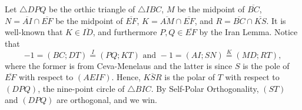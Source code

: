 Let $\triangle DPQ$ be the orthic triangle of $\triangle IBC$, $M$ be the midpoint of $\overline{BC}$, $N=\overline{AI}\cap\overline{EF}$ be the midpoint of $\overline{EF}$, $K=\overline{AM}\cap\overline{EF}$, and $R=\overline{BC}\cap\overline{KS}$. It is well-known that $K\in\overline{ID}$, and furthermore $P,Q\in\overline{EF}$ by the Iran Lemma. Notice that \[-1=(BC;DT)\stackrel I=(PQ;KT)\text{ and }-1=(AI;SN)\stackrel K=(MD;RT),\]
where the former is from Ceva-Menelaus and the latter is since $S$ is the pole of $\overline{EF}$ with respect to $(AEIF)$. Hence, $\overline{KSR}$ is the polar of $T$ with respect to $(DPQ)$, the nine-point circle of $\triangle BIC$. By Self-Polar Orthogonality, $(ST)$ and $(DPQ)$ are orthogonal, and we win.
